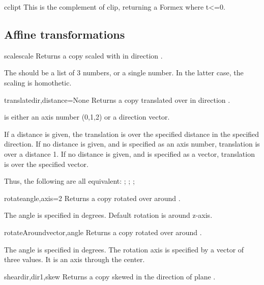 {{\begin{methoddesc}{cclip}{t}
This is the complement of clip, returning a Formex where t<=0.
\end{methoddesc}



\subsection{Affine transformations}

\begin{methoddesc}{scale}{scale}
Returns a copy scaled with  in direction .

The  should be a list of 3 numbers, or a single number. In the latter case, the scaling is homothetic.
\end{methoddesc}

\begin{methoddesc}{translate}{dir,distance=None}
Returns a copy translated over  in direction .

 is either an axis number (0,1,2) or a direction vector.

If a distance is given, the translation is over the specified
distance in the specified direction.
If no distance is given, and  is specified as an axis number,
translation is over a distance 1.
If no distance is given, and  is specified as a vector, translation
is over the specified vector.

Thus, the following are all equivalent:
;
;
;
\end{methoddesc}

\begin{methoddesc}{rotate}{angle,axis=2}
Returns a copy rotated over  around .

The angle is specified in degrees. Default rotation is around z-axis.
\end{methoddesc}

\begin{methoddesc}{rotateAround}{vector,angle}
Returns a copy rotated over  around .

The angle is specified in degrees. The rotation axis is specified by a vector of three values. It is an axis through the center.
\end{methoddesc}

\begin{methoddesc}{shear}{dir,dir1,skew}
Returns a copy skewed in the direction  of plane .


\end{methoddesc}}}
